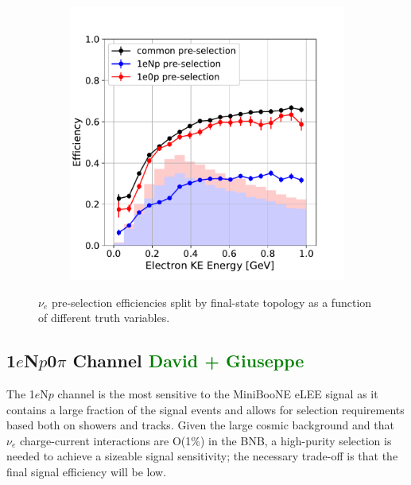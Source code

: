 \documentclass[a4paper]{article}
\newcommand{\npsel}{1$e$N$p$0$\pi$ }
\begin{document}
\begin{figure}[H]
\begin{center}
\begin{subfigure}[b]{0.3\textwidth}
    \caption{\label{fig:nue:presel:eff:proton} }
    \end{subfigure}
    \begin{subfigure}[b]{0.3\textwidth}
    \centering
    \includegraphics[width=1.00\textwidth]{nueselection/elec_RUN1.pdf}
    \caption{\label{fig:nue:presel:eff:elec} }
    \end{subfigure}
\caption{\label{fig:nue:presel:eff} $\nu_e$ pre-selection efficiencies split by final-state topology as a function of different truth variables.}
\end{center}
\end{figure}

\subsection{\npsel Channel \textcolor{green}{David + Giuseppe}}
\label{sec:nueselection:1eNp}

The 1$e$N$p$ channel is the most sensitive to the MiniBooNE eLEE signal as it contains a large fraction of the signal events and allows for selection requirements based both on showers and tracks. 
Given the large cosmic background and that $\nu_e$ charge-current interactions are O(1\%) in the BNB, a high-purity selection is needed to achieve a sizeable signal sensitivity; the necessary trade-off is that the final signal efficiency will be low.
\end{document}
